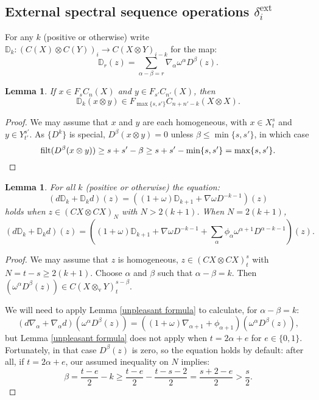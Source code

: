 \documentclass[11pt]{amsart} \renewcommand{\baselinestretch}{1.2}
\theoremstyle{plain}
\newtheorem{lem}[thm]{Lemma}
\numberwithin{equation}{section} %
\theoremstyle{plain}
\newtheorem{lem}[thm]{Lemma}
\numberwithin{equation}{chapter} %
\let\oldphi\phi
\let\phi\varphi
\renewcommand{\to}{\longrightarrow}
\newcommand{\twist}{\omega}
\newcommand{\Nabla}{\nabla}
\newcommand{\filt}{\mathrm{filt}}
\newcommand{\dver}{_\mathrm{v}}
\newcommand{\SubsectionOrSection}[1]{\subsection{#1}}
\begin{document}
\begin{second quadrant homotopy sseq operations}
\SubsectionOrSection{External spectral sequence operations $\delta^\mathrm{ext}_i$}
\label{External spectral sequence operations delta}
For any $k$ (positive or otherwise) write $\mathbb{D}_k:(C(X)\otimes C(Y))_i\to C(X\otimes Y)_{i-k}$ for the map:
\[\mathbb{D}_r(z)= \sum_{\alpha-\beta=r}\Nabla_\alpha\twist^\alpha D^\beta(z).
\]
\begin{lem}
\label{DkIsNiceToFiltration}
If $x\in F_sC_n(X)$ and $y\in F_{s'}C_{n'}(X)$, then \[\mathbb{D}_k(x\otimes  y)\in F_{\max\{s,s'\}}C_{n+n'-k}(X\otimes X).\]%
\end{lem}
\begin{proof}
We may assume that $x$ and $y$ are each homogeneous, with $x\in X^{s}_{t}$ and $y\in Y^{s'}_{t'}$. As $\{D^k\}$ is special, $D^{\beta}(x\otimes y)=0$ unless $\beta\leq \min\{s,s'\}$, in which case
\[\filt(D^{\beta}(x\otimes y))\geq s+s'-\beta\geq s+s'-\min\{s,s'\}=\max\{s,s'\}.\qedhere\]%
\end{proof}
\begin{lem}
\label{boundaryVsBBD}
For all $k$ (positive or otherwise) the equation:
\[(d\mathbb{D}_k+\mathbb{D}_kd)(z)= ((1+\twist)\mathbb{D}_{k+1}+\Nabla\twist D^{-k-1})(z)\]
holds when $z\in (CX\otimes CX)_N$ with $N>2(k+1)$. When $N= 2(k+1)$, 
\[(d\mathbb{D}_k+\mathbb{D}_kd)(z)= ((1+\twist)\mathbb{D}_{k+1}+\Nabla\twist D^{-k-1}+\textstyle\sum_{\alpha} \oldphi_{\alpha}\twist^{\alpha+1} D^{\alpha-k-1})(z).\]
\end{lem}
\begin{proof}
\newcommand{\twolinesum}[2]{\mathop{\sum_{\mathclap{#1}}}_{\mathclap{#2}}}
\newcommand{\onelinesum}[1]{\sum_{\mathclap{#1}}}
We may assume that $ z$ is homogeneous, $z\in (CX\otimes CX)_{t}^{s}$ with $N=t-s\geq2(k+1)$. Choose $\alpha$ and $\beta$ such that $\alpha-\beta=k$. Then $(\twist^\alpha D^\beta(z))\in C(X\otimes\dver Y)^{s-\beta}_{t}$.

We will need to apply Lemma \ref{unpleasant formula} to calculate, for $\alpha-\beta=k$:
\[(d\Nabla_\alpha+\Nabla_\alpha d)(\twist^\alpha D^\beta(z))=((1+\twist)\Nabla_{\alpha+1}+\oldphi_{\alpha+1} )(\twist^\alpha D^\beta(z)),\]
but Lemma \ref{unpleasant formula} does not apply when $t=2\alpha+e$ for $e\in\{0,1\}$. Fortunately, in that case $D^\beta(z)$ is zero, so the equation holds by default: after all, if $t=2\alpha+e$, our assumed inequality on $N$ implies:
\[\beta=\frac{t-e}{2}-k\geq \frac{t-e}{2}-\frac{t-s-2}{2}=\frac{s+2-e}{2}>\frac{s}{2}.\]


\end{proof}
\end{second quadrant homotopy sseq operations}
\end{document}
